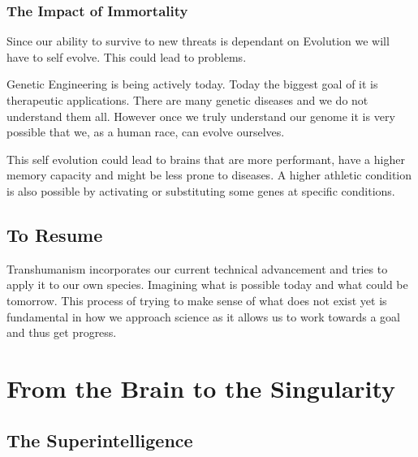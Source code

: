 \documentclass[
      12pt,
      a4paper,
      cleardoublepage=empty,
      final,
      twoside
        ]{scrbook}
\begin{document}
    \subsection{The Impact of Immortality}
      \begin{par}

        Since our ability to survive to new threats is dependant on Evolution we will have to self evolve. This could lead to problems.
  
      \end{par}
      \begin{par}
        Genetic Engineering is being actively today.
        Today the biggest goal of it is therapeutic applications. 
        There are many genetic diseases and we do not understand them all.
        However once we truly understand our genome it is very possible that we, as a human race, can evolve ourselves.
      \end{par}
      \begin{par}
        This self evolution could lead to brains that are more performant, have a higher memory capacity and might be less prone to diseases.
        A higher athletic condition is also possible by activating or substituting some genes at specific conditions.
      \end{par}
  \section{To Resume}
    \begin{par}
      Transhumanism incorporates our current technical advancement and tries to apply it to our own species. 
      Imagining what is possible today and what could be tomorrow.
      This process of trying to make sense of what does not exist yet is fundamental in how we approach science as it allows us to work towards a goal and thus get progress.
      
    \end{par}

\chapter{From the Brain to the Singularity}
  \section{The Superintelligence}
\end{document}
